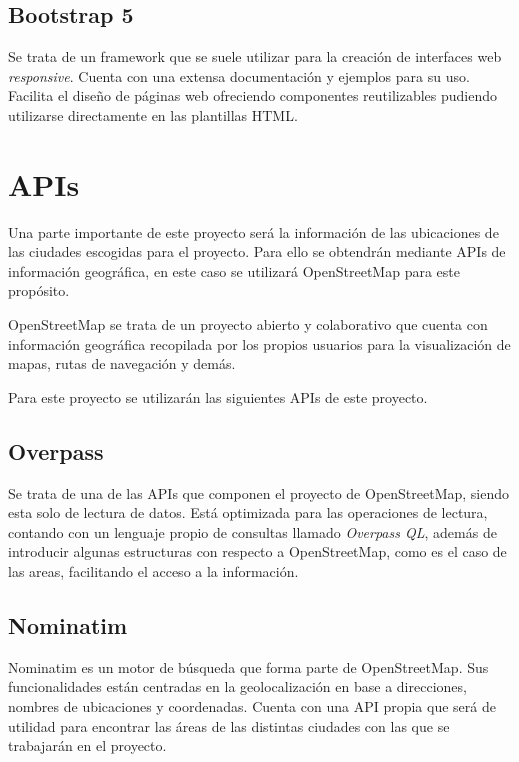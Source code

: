 \subsection{Bootstrap 5}
Se trata de un framework que se suele utilizar para la creación de interfaces web \textit{responsive}.
Cuenta con una extensa documentación y ejemplos para su uso. Facilita el diseño de páginas web ofreciendo
componentes reutilizables pudiendo utilizarse directamente en las plantillas HTML.


\section{APIs}
Una parte importante de este proyecto será la información de las ubicaciones de las ciudades escogidas
para el proyecto. Para ello se obtendrán mediante APIs de información geográfica, en este caso se utilizará
OpenStreetMap para este propósito. 

OpenStreetMap se trata de un proyecto abierto y colaborativo que cuenta con información geográfica
recopilada por los propios usuarios para la visualización de mapas, rutas de navegación y demás.

Para este proyecto se utilizarán las siguientes APIs de este proyecto. 

\subsection{Overpass}
Se trata de una de las APIs que componen el proyecto de OpenStreetMap, siendo esta solo de lectura de datos.
Está optimizada para las operaciones de lectura, contando con un lenguaje propio de consultas llamado \textit{Overpass QL},
además de introducir algunas estructuras con respecto a OpenStreetMap, como es el caso de las areas, facilitando el acceso a la información.

\subsection{Nominatim}
Nominatim es un motor de búsqueda que forma parte de OpenStreetMap. Sus funcionalidades están centradas en la 
geolocalización en base a direcciones, nombres de ubicaciones y coordenadas. Cuenta con una API propia
que será de utilidad para encontrar las áreas de las distintas ciudades con las que se trabajarán en el proyecto.

